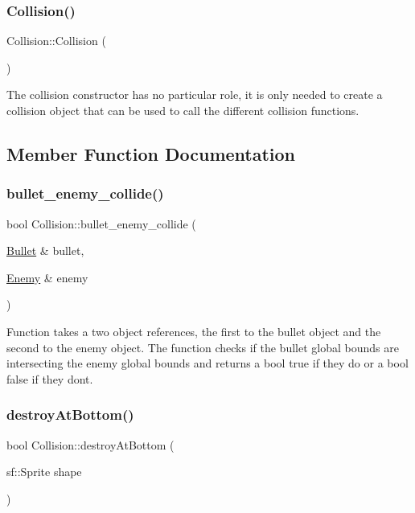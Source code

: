 \subsubsection{\texorpdfstring{Collision()}{Collision()}}
{\footnotesize\ttfamily Collision\+::\+Collision (\begin{DoxyParamCaption}{ }\end{DoxyParamCaption})\hspace{0.3cm}{\ttfamily [inline]}}

The collision constructor has no particular role, it is only needed to create a collision object that can be used to call the different collision functions. 

\subsection{Member Function Documentation}
\mbox{\label{classCollision_a213b32a24bb00368732cd7170049c65e}} 
\subsubsection{\texorpdfstring{bullet\+\_\+enemy\+\_\+collide()}{bullet\_enemy\_collide()}}
{\footnotesize\ttfamily bool Collision\+::bullet\+\_\+enemy\+\_\+collide (\begin{DoxyParamCaption}\item[{\hyperlink{classBullet}{Bullet} \&}]{bullet,  }\item[{\hyperlink{classEnemy}{Enemy} \&}]{enemy }\end{DoxyParamCaption})}

Function takes a two object references, the first to the bullet object and the second to the enemy object. The function checks if the bullet global bounds are intersecting the enemy global bounds and returns a bool true if they do or a bool false if they don\textquotesingle{}t. \mbox{\label{classCollision_a3dcc2e9cfec6cc09445681a14fd3bfe4}} 
\subsubsection{\texorpdfstring{destroy\+At\+Bottom()}{destroyAtBottom()}}
{\footnotesize\ttfamily bool Collision\+::destroy\+At\+Bottom (\begin{DoxyParamCaption}\item[{sf\+::\+Sprite}]{shape }\end{DoxyParamCaption})}

